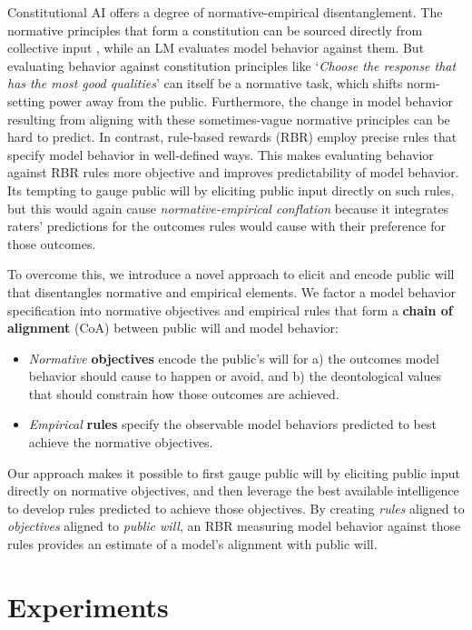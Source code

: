 \documentclass{article}
\begin{document}
Constitutional AI \cite{bai2022constitutional, Huang_2024} offers a degree of normative-empirical disentanglement. The normative principles that form a constitution can be sourced directly from collective input \cite{Huang_2024}, while an LM evaluates model behavior against them. But evaluating behavior against constitution principles like `\emph{Choose the response that has the most good qualities}' can itself be a normative task, which shifts norm-setting power away from the public. Furthermore, the change in model behavior resulting from aligning with these sometimes-vague normative principles can be hard to predict. In contrast, rule-based rewards (RBR) \cite{mu2024rulebased, kundu2023specific, zhu2021rule} employ precise rules that specify model behavior in well-defined ways. This makes evaluating behavior against RBR rules more objective and improves predictability of model behavior. Its tempting to gauge public will by eliciting public input directly on such rules, but this would again cause \emph{normative-empirical conflation} because it integrates raters' predictions for the outcomes rules would cause with their preference for those outcomes. 

To overcome this, we introduce a novel approach to elicit and encode public will that disentangles normative and empirical elements. We factor a model behavior specification into normative objectives and empirical rules that form a \textbf{chain of alignment} (CoA) between public will and model behavior:
\begin{itemize}
    \item \emph{Normative} \textbf{objectives} encode the public’s will for a) the outcomes model behavior should cause to happen or avoid, and b) the deontological values that should constrain how those outcomes are achieved.
    \item \emph{Empirical} \textbf{rules} specify the observable model behaviors predicted to best achieve the normative objectives.
\end{itemize}
Our approach makes it possible to first gauge public will by eliciting public input directly on normative objectives,
and then leverage the best available intelligence to develop rules predicted to achieve those objectives. By creating \emph{rules} aligned to \emph{objectives} aligned to \emph{public will}, an RBR measuring model behavior against those rules provides an estimate of a model’s alignment with public will. 


\section{Experiments}
\end{document}
